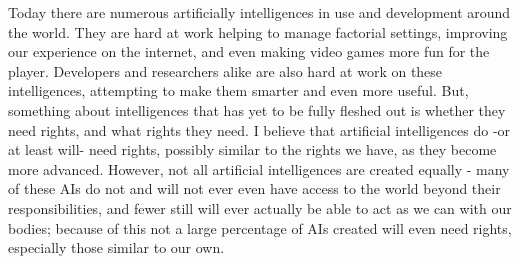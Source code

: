 Today there are numerous artificially intelligences in use and development around the world. They are hard at work helping to manage factorial settings, improving our experience on the internet, and even making video games more fun for the player. Developers and researchers alike are also hard at work on these intelligences, attempting to make them smarter and even more useful. But, something about intelligences that has yet to be fully fleshed out is whether they need rights, and what rights they need. I believe that artificial intelligences do -or at least will- need rights, possibly similar to the rights we have, as they become more advanced. However, not all artificial intelligences are created equally - many of these AIs do not and will not ever even have access to the world beyond their responsibilities, and fewer still will ever actually be able to act as we can with our bodies; because of this not a large percentage of AIs created will even need rights, especially those similar to our own.